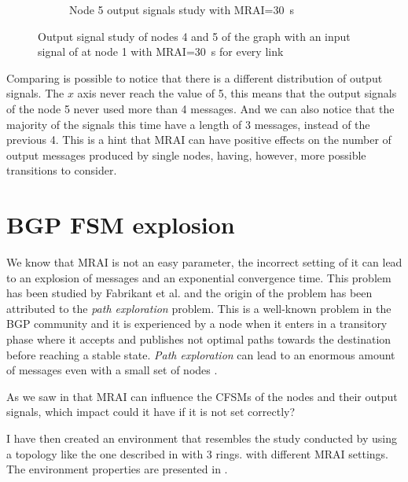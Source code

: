 \begin{figure}[h]
\begin{subfigure}[b]{0.45\textwidth}
		 \caption{Node \num{5} output signals study with \ac{MRAI}=\SI{30}{\second}}
         \label{fig:signal_node5_MRAI}
     \end{subfigure}
		\caption{Output signal study of nodes \num{4} and \num{5} of the graph 
			 with an input signal of  at node \num{1}
			with \ac{MRAI}=\SI{30}{\second} for every link}
        \label{fig:signal_griffin_fig4_MRAI}
\end{figure}

Comparing  is possible to notice
that there is a different distribution of output signals.
The $x$ axis never reach the value of \num{5}, this means that the output signals
of the node \num{5} never used more than \num{4} messages.
And we can also notice that the majority of the signals this time have a length
of \num{3} messages, instead of the previous \num{4}.
This is a hint that \ac{MRAI} can have positive effects on the number of output messages
produced by single nodes, having, however, more possible transitions to consider.

\section{BGP FSM explosion}
\label{sec:bgp_fsm_explosion}

We know that \ac{MRAI} is not an easy parameter, the incorrect setting of
it can lead to an explosion of messages and an exponential convergence time.
This problem has been studied by Fabrikant et al. \cite{fabrikant2011there} and
the origin of the problem has been attributed to the \textit{path exploration}
problem.
This is a well-known problem in the \ac{BGP} community and it is experienced
by a node when it enters in a transitory phase where it accepts and publishes not
optimal paths towards the destination before reaching a stable state.
\textit{Path exploration} can lead to an enormous amount of messages even with
a small set of nodes \cite{deshpande2004impact}.

As we saw in  that \ac{MRAI} can influence the
\ac{CFSM}s of the nodes and their output signals, which impact could it have
if it is not set correctly?

I have then created an environment that resembles the study conducted by
\cite{fabrikant2011there} using a topology like the one described in 
with \num{3} rings.
with different \ac{MRAI} settings.
The environment properties are presented in .

